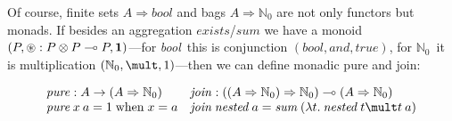 \documentclass[runningheads]{llncs}
\newlength\codeoffset
\newcommand\strong[1]{{\bfseries#1}}
\newcommand\todo[1]{{\color{IndianRed}#1}}
\newcommand\xxx{\text{\todo{\strong{XXX}}}}
\renewcommand\todo[1]{\ignorespaces}\renewcommand\xxx{\text{\color{IndianRed}\strong{XXX}}}
\newcommand\name[1]{\ensuremath{\mathit{#1}}}
\newcommand\<\:                 %
\newcommand\fnspace{\<}         %
\newcommand\fn[1]{\lambda{#1}.\fnspace}
\newcommand\lto\multimap        %
\newcommand\fto\Rightarrow
\newcommand\typename\textit
\newcommand\bool{\typename{bool}}
\newcommand\kword[1]{\ensuremath{\textrm{#1}}}
\newcommand\true{\name{true}}
\newcommand\whenkword{\kword{when}}
\newcommand\when{\mathrel{\whenkword}}
\newcommand\nat{\mathbb{N}}
\newcommand\natz{\ensuremath{\nat_0}}
\begin{document}
\noindent
Of course, finite sets $A \fto \bool$ and bags $A \fto \natz$ are not only functors but monads.
If besides an aggregation \name{exists}/\name{sum} we have a monoid $(P, {\oast} : P \otimes P \lto P, \boldsymbol 1)$---for \bool\ this is conjunction $(\bool, \name{and}, \true)$, for \natz\ it is multiplication $(\natz, \mult, 1)$---then we can define monadic pure and join:
\todo{presumably this is a lawful monad if this forms a semiring?}

\begin{align*}
  &
  \name{pure} : A \to (A \fto \natz)
  &&
  \name{join} : ((A \fto \natz) \fto \natz) \lto (A \fto \natz)
  \\[-3pt]
  &
  \name{pure} \<x \<a = 1 \when x = a
  &&
  \name{join} \<\name{nested} \<a =
  \name{sum} \<(\fn t \name{nested} \<t \mult t\<a)
\end{align*}



\end{document}

